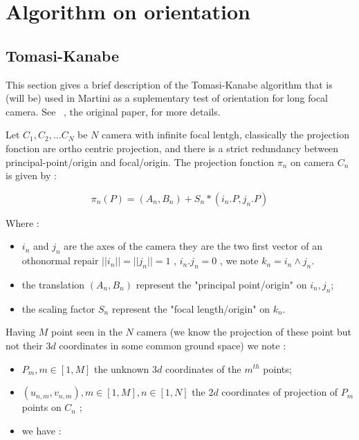 \chapter{Algorithm on orientation}


\section{Tomasi-Kanabe}

This section gives a brief description of the Tomasi-Kanabe algorithm
that is (will be) used in Martini as a suplementary test of
orientation for long focal camera. See~\cite{TomKan} , the original paper,
for more details.


Let $C_1,C_2, \dots C_N$ be $N$ camera with infinite focal lentgh, classically
the projection fonction are ortho centric projection, and there is a strict redundancy between principal-point/origin and  focal/origin. The projection fonction $\pi_n$ on camera $C_n$ is given by :

\begin{equation}
   \pi_n(P) =  (A_n,B_n)   + S_n * (i_n . P , j_n.P) \label{TomKanProj}
\end{equation}

Where :

\begin{itemize}
   \item  $i_n$ and $j_n$ are the axes of the camera they are the two first vector
          of an othonormal repair $||i_n|| = ||j_n|| = 1$ , $i_n . j_n = 0 $ ,
          we note $k_n = i_n \wedge j_n$.
   \item  the translation $(A_n,B_n)$ represent the "principal point/origin" on $i_n,j_n$;
   \item  the scaling factor $S_n$ represent the "focal length/origin" on $k_n$.
\end{itemize}


Having $M$ point seen in the $N$ camera  (we know the projection of these 
point but not their $3d$ coordinates in some common ground space) we note :

\begin{itemize}
    \item $P_m , m \in[1,M]$  the unknown $3d$ coordinates of the $m^{th}$ points;
    \item $(u_{n,m},v_{n,m}), m \in[1,M], n \in [1,N] $   the $2d$ coordinates of projection
          of $P_m$ points on $C_n$ ;
    \item we have :
\end{itemize}

